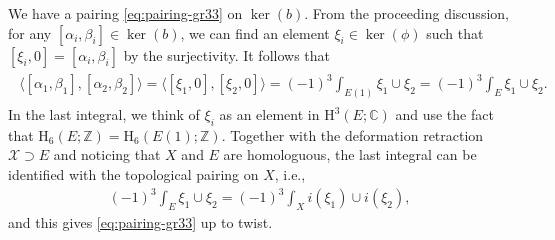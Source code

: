 We have a pairing \eqref{eq:pairing-gr33} on \(\operatorname{ker}(b)\).
From the proceeding discussion, for any \([\alpha_{i},\beta_{i}]\in
\operatorname{ker}(b)\), we can find an element \(\xi_{i}\in\operatorname{ker}(\phi)\)
such that \([\xi_{i},0]=[\alpha_{i},\beta_{i}]\) by the surjectivity.
It follows that
\begin{align}
\begin{split}
\langle [\alpha_{1},\beta_{1}],[\alpha_{2},\beta_{2}]\rangle =
\langle [\xi_{1},0],[\xi_{2},0]\rangle = (-1)^{3}\int_{E(1)}\xi_{1}\cup \xi_{2}
=(-1)^{3}\int_{E}\xi_{1}\cup \xi_{2}.
\end{split}
\end{align}
In the last integral, we think of \(\xi_{i}\) as an element in \(\mathrm{H}^{3}(E;\mathbb{C})\)
and use the fact that \(\mathrm{H}_{6}(E;\mathbb{Z})=\mathrm{H}_{6}(E(1);\mathbb{Z})\).
Together with the deformation retraction \(\mathcal{X}\supset E\) and
noticing that \(X\) and \(E\) are homologuous,
the last integral can be identified with the topological pairing 
on \(X\), i.e.,
\begin{eqnarray*}
(-1)^{3}\int_{E}\xi_{1}\cup \xi_{2}=(-1)^{3}\int_{X} i(\xi_{1})\cup i(\xi_{2}),
\end{eqnarray*}
and this gives \eqref{eq:pairing-gr33} up to twist.

